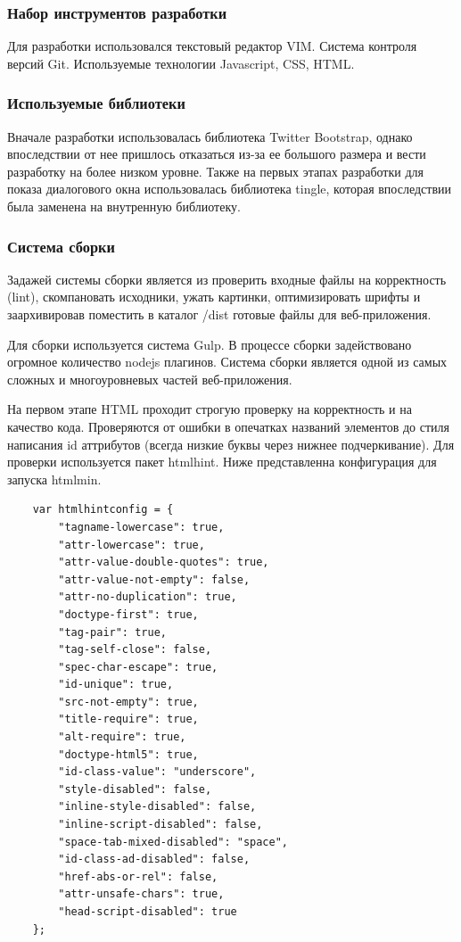 \subsubsection{Набор инструментов разработки}
Для разработки использовался текстовый редактор VIM. Система контроля версий Git. Используемые технологии Javascript, CSS, HTML.

\subsubsection{Используемые библиотеки}
Вначале разработки использовалась библиотека Twitter Bootstrap, однако впоследствии от нее пришлось отказаться из-за ее большого размера и вести разработку на более низком уровне.
Также на первых этапах разработки для показа диалогового окна использовалась библиотека tingle, которая впоследствии была заменена на внутренную библиотеку.

\subsubsection{Система сборки}
Задажей системы сборки является из проверить входные файлы на корректность (lint), скомпановать исходники, ужать картинки, оптимизировать шрифты и заархивировав поместить в каталог /dist готовые файлы для веб-приложения.

Для сборки используется система Gulp. В процессе сборки задействовано огромное количество nodejs плагинов. 
Система сборки является одной из самых сложных и многоуровневых частей веб-приложения. 

На первом этапе HTML проходит строгую проверку на корректность и на качество кода. Проверяются от ошибки в опечатках названий элементов до стиля написания id аттрибутов (всегда низкие буквы через нижнее подчеркивание). Для проверки используется пакет htmlhint. 
Ниже представленна конфигурация для запуска htmlmin.

\begin{small}
\begin{verbatim}
    var htmlhintconfig = {
        "tagname-lowercase": true,
        "attr-lowercase": true,
        "attr-value-double-quotes": true,
        "attr-value-not-empty": false,
        "attr-no-duplication": true,
        "doctype-first": true,
        "tag-pair": true,
        "tag-self-close": false,
        "spec-char-escape": true,
        "id-unique": true,
        "src-not-empty": true,
        "title-require": true,
        "alt-require": true,
        "doctype-html5": true,
        "id-class-value": "underscore",
        "style-disabled": false,
        "inline-style-disabled": false,
        "inline-script-disabled": false,
        "space-tab-mixed-disabled": "space",
        "id-class-ad-disabled": false,
        "href-abs-or-rel": false,
        "attr-unsafe-chars": true,
        "head-script-disabled": true
    };
\end{verbatim}
\end{small}


